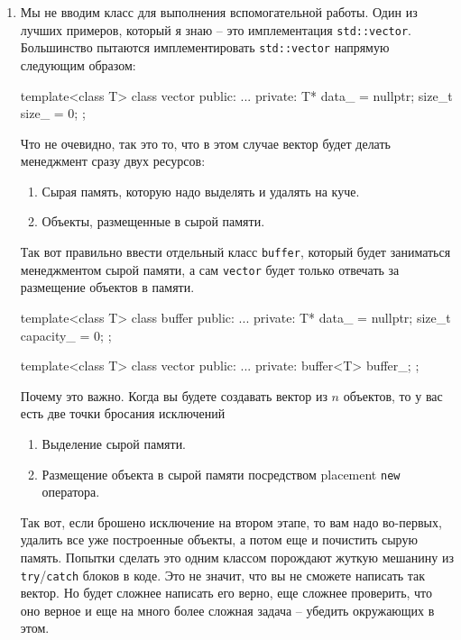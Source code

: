 \begin{enumerate}
\begin{cppcode}
\end{cppcode}
Использование view-объектов делает подход менее явным и сопоставимым с использованием ссылок напрямую со стороны пользователя метода.
Главный плюс лишь в том, что тут мы избавляемся от вида контейнера и его точного типа.
Такое поведение может быть желаемым.
Ну и никто вам не мешает сделать свой view-объект, который строится по указателю на контейнер.
Так же использование ссылок или view-объектов не дает ощутимо большей надежности при исключениях.
Если метод \verb"shuffle" внутри кидает исключение, то \verb"indices" не лишится своего содержимого (если view-объект дает только доступ к элементам, но не возможность изменить контейнер), но оно все еще может быть изменено.

\item Мы не вводим класс для выполнения вспомогательной работы.
Один из лучших примеров, который я знаю -- это имплементация \verb"std::vector".
Большинство пытаются имплементировать \verb"std::vector" напрямую следующим образом:
\begin{cppcode}
template<class T>
class vector {
public:
  ...
private:
  T* data_ = nullptr;
  size_t size_ = 0;
};
\end{cppcode}
Что не очевидно, так это то, что в этом случае вектор будет делать менеджмент сразу двух ресурсов:
\begin{enumerate}
\item Сырая память, которую надо выделять и удалять на куче.

\item Объекты, размещенные в сырой памяти.
\end{enumerate}
Так вот правильно ввести отдельный класс \verb"buffer", который будет заниматься менеджментом сырой памяти, а сам \verb"vector" будет только отвечать за размещение объектов в памяти.
\begin{cppcode}
template<class T>
class buffer {
public:
  ...
private:
  T* data_ = nullptr;
  size_t capacity_ = 0;
};

template<class T>
class vector {
public:
  ...
private:
  buffer<T> buffer_;
};
\end{cppcode}
Почему это важно.
Когда вы будете создавать вектор из $n$ объектов, то у вас есть две точки бросания исключений
\begin{enumerate}
\item Выделение сырой памяти.

\item Размещение объекта в сырой памяти посредством placement \verb"new" оператора.
\end{enumerate}
Так вот, если брошено исключение на втором этапе, то вам надо во-первых, удалить все уже построенные объекты, а потом еще и почистить сырую память.
Попытки сделать это одним классом порождают жуткую мешанину из \verb"try"/\verb"catch" блоков в коде.
Это не значит, что вы не сможете написать так вектор.
Но будет сложнее написать его верно, еще сложнее проверить, что оно верное и еще на много более сложная задача -- убедить окружающих в этом.


\end{enumerate}
